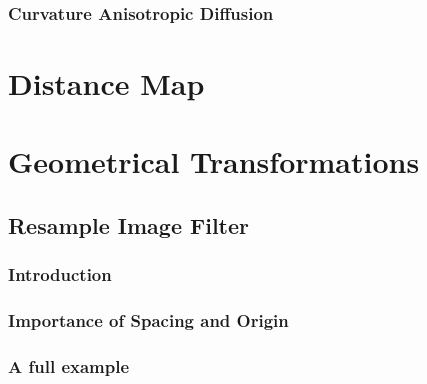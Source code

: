 %

\subsubsection{Curvature Anisotropic Diffusion}
\label{sec:ColorCurvatureAnisotropicDiffusion}

%



\section{Distance Map}
\label{sec:DistanceMap}

%



\section{Geometrical Transformations}
\label{sec:GeometricalTransformationFilters}

\subsection{Resample Image Filter}

\subsubsection{Introduction}


\subsubsection{Importance of Spacing and Origin}


\subsubsection{A full example}




